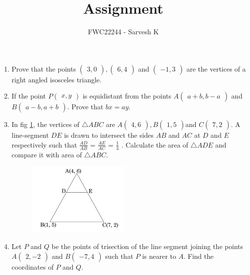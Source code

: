\documentclass[12pt,-letter paper]{article}
\theoremstyle{remark}
\newcommand{\myvec}[1]{\ensuremath{\begin{pmatrix}#1\end{pmatrix}}}
\begin{document}
\vspace{3cm}

\title{Assignment}
\author{FWC22244 - Sarvesh K}
\maketitle
\begin{enumerate}
      \section{Vectors}
\item  Prove that the points $\myvec{3,0}, \myvec{6, 4}$ and $\myvec{-1, 3}$ are the vertices of a right angled isosceles triangle.\\
\item  If the point $P\myvec{x, y}$ is equidistant from the points $A\myvec{a+b, b-a}$ and $B\myvec{a-b, a+b}$. Prove that $bx=ay$.\\
\item In fig \ref{figure_1}, the vertices of $\triangle ABC$ are $A\myvec{4, 6}, B\myvec{1, 5}$and $C\myvec{7, 2}$. A line-segment $DE$ is drawn to intersect the sides $AB$ and $AC$ at $D$ and $E$ respectively such that $\frac{AD}{AB}$ = $\frac{AE}{AC}$ = $\frac{1}{3}$ . Calculate the area of $ \triangle ADE$ and compare it with area of $ \triangle ABC$.\\
	\begin{figure}[H]
      \centering
      \includegraphics[width=5cm]{figs/8.png}
     \caption{}
      \label{figure_1}
\end{figure} 
\item  Let $P$ and $Q$ be the points of trisection of the line segment joining the points $A\myvec{2,-2}$ and $B\myvec{-7, 4}$ such that $P$ is nearer to $A$. Find the coordinates of $P$ and $Q$.\\


\end{enumerate}
\end{document}
